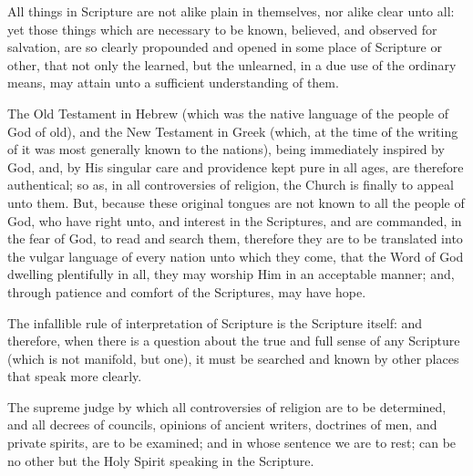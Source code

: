 \begin{outerlst}[left=0pt,labelsep=0pt]
\begin{innerlst}[wide, labelwidth=!, labelindent=0pt, labelsep=4pt]
\item All things in Scripture are not alike plain in themselves, nor alike clear unto all: yet those things which are necessary to be known, believed, and observed for salvation, are so clearly propounded and opened in some place of Scripture or other, that not only the learned, but the unlearned, in a due use of the ordinary means, may attain unto a sufficient understanding of them.   

\item The Old Testament in Hebrew (which was the native language of the people of God of old), and the New Testament in Greek (which, at the time of the writing of it was most generally known to the nations), being immediately inspired by God, and, by His singular care and providence kept pure in all ages, are therefore authentical; so as, in all controversies of religion, the Church is finally to appeal unto them. But, because these original tongues are not known to all the people of God, who have right unto, and interest in the Scriptures, and are commanded, in the fear of God, to read and search them, therefore they are to be translated into the vulgar language of every nation unto which they come, that the Word of God dwelling plentifully in all, they may worship Him in an acceptable manner; and, through patience and comfort of the Scriptures, may have hope.   

\item The infallible rule of interpretation of Scripture is the Scripture itself: and therefore, when there is a question about the true and full sense of any Scripture (which is not manifold, but one), it must be searched and known by other places that speak more clearly.   

\item The supreme judge by which all controversies of religion are to be determined, and all decrees of councils, opinions of ancient writers, doctrines of men, and private spirits, are to be examined; and in whose sentence we are to rest; can be no other but the Holy Spirit speaking in the Scripture.  
\end{innerlst}

\item
{}

\end{outerlst}

